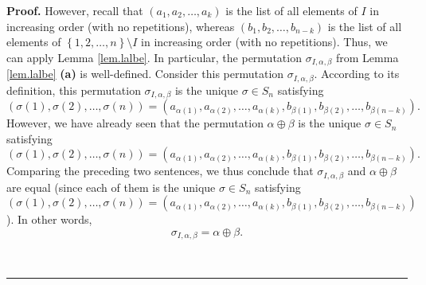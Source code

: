 \documentclass[numbers=enddot,12pt,final,onecolumn,notitlepage,english]{scrartcl}%
\theoremstyle{definition}
\newenvironment{proof}[1][Proof]{\noindent\textbf{#1.} }{\ \rule{0.5em}{0.5em}}
\newenvironment{verlong}{}{}
\begin{document}
\begin{verlong}
\begin{proof}
However, recall that $\left(  a_{1},a_{2},\ldots,a_{k}\right)  $ is the list
of all elements of $I$ in increasing order (with no repetitions), whereas
$\left(  b_{1},b_{2},\ldots,b_{n-k}\right)  $ is the list of all elements of
$\left\{  1,2,\ldots,n\right\}  \setminus I$ in increasing order (with no
repetitions). Thus, we can apply Lemma \ref{lem.lalbe}. In particular, the
permutation $\sigma_{I,\alpha,\beta}$ from Lemma \ref{lem.lalbe} \textbf{(a)}
is well-defined. Consider this permutation $\sigma_{I,\alpha,\beta}$.
According to its definition, this permutation $\sigma_{I,\alpha,\beta}$ is the
unique $\sigma\in S_{n}$ satisfying%
\[
\left(  \sigma\left(  1\right)  ,\sigma\left(  2\right)  ,\ldots,\sigma\left(
n\right)  \right)  =\left(  a_{\alpha\left(  1\right)  },a_{\alpha\left(
2\right)  },\ldots,a_{\alpha\left(  k\right)  },b_{\beta\left(  1\right)
},b_{\beta\left(  2\right)  },\ldots,b_{\beta\left(  n-k\right)  }\right)  .
\]
However, we have already seen that the permutation $\alpha\oplus\beta$ is the
unique $\sigma\in S_{n}$ satisfying%
\[
\left(  \sigma\left(  1\right)  ,\sigma\left(  2\right)  ,\ldots,\sigma\left(
n\right)  \right)  =\left(  a_{\alpha\left(  1\right)  },a_{\alpha\left(
2\right)  },\ldots,a_{\alpha\left(  k\right)  },b_{\beta\left(  1\right)
},b_{\beta\left(  2\right)  },\ldots,b_{\beta\left(  n-k\right)  }\right)  .
\]
Comparing the preceding two sentences, we thus conclude that $\sigma
_{I,\alpha,\beta}$ and $\alpha\oplus\beta$ are equal (since each of them is
the unique $\sigma\in S_{n}$ satisfying%
\[
\left(  \sigma\left(  1\right)  ,\sigma\left(  2\right)  ,\ldots,\sigma\left(
n\right)  \right)  =\left(  a_{\alpha\left(  1\right)  },a_{\alpha\left(
2\right)  },\ldots,a_{\alpha\left(  k\right)  },b_{\beta\left(  1\right)
},b_{\beta\left(  2\right)  },\ldots,b_{\beta\left(  n-k\right)  }\right)
\]
). In other words,
\begin{equation}
\sigma_{I,\alpha,\beta}=\alpha\oplus\beta. \label{pf.lem.lalbe-k.apb=}%
\end{equation}



\end{proof}
\end{verlong}
\end{document}
